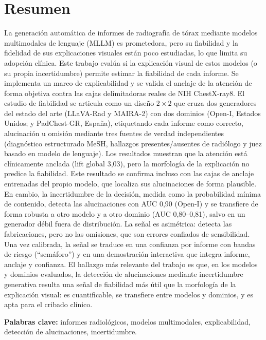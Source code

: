 \chapter*{Resumen}

La generación automática de informes de radiografía de tórax mediante modelos multimodales de
lenguaje (MLLM) es prometedora, pero su fiabilidad y la fidelidad de sus explicaciones visuales están
poco estudiadas, lo que limita su adopción clínica. Este trabajo evalúa si la explicación visual de
estos modelos (o su propia incertidumbre) permite estimar la fiabilidad de cada informe. Se
implementa un marco de explicabilidad y se valida el anclaje de la atención de forma objetiva contra
las cajas delimitadoras reales de NIH ChestX-ray8. El estudio de fiabilidad se articula como un diseño
\(2\times2\) que cruza dos generadores del estado del arte (LLaVA-Rad y MAIRA-2) con dos dominios
(Open-I, Estados Unidos; y PadChest-GR, España), etiquetando cada informe como correcto, alucinación u
omisión mediante tres fuentes de verdad independientes (diagnóstico estructurado MeSH, hallazgos
presentes/ausentes de radiólogo y juez basado en modelo de lenguaje). Los resultados muestran que la
atención está clínicamente anclada (lift global 3,03), pero la morfología de la explicación no predice
la fiabilidad. Este resultado se confirma incluso con las cajas de anclaje entrenadas del propio
modelo, que localiza sus alucinaciones de forma plausible. En cambio, la incertidumbre de la decisión, medida
como la probabilidad mínima de contenido, detecta las alucinaciones con AUC 0,90 (Open-I) y se
transfiere de forma robusta a otro modelo y a otro dominio (AUC 0,80--0,81), salvo en un generador
débil fuera de distribución. La señal es asimétrica: detecta las fabricaciones, pero no las omisiones,
que son errores confiados de sensibilidad. Una vez calibrada, la señal se traduce en una confianza por
informe con bandas de riesgo (``semáforo'') y en una demostración interactiva que integra informe,
anclaje y confianza. El hallazgo más relevante del trabajo es que, en los modelos y dominios
evaluados, la detección de alucinaciones mediante incertidumbre generativa resulta una señal
de fiabilidad más útil que la morfología de la explicación visual: es cuantificable, se transfiere
entre modelos y dominios, y es apta para el cribado clínico.

\vspace{0.4cm}\noindent\textbf{Palabras clave:} informes radiológicos, modelos multimodales,
explicabilidad, detección de alucinaciones, incertidumbre.

